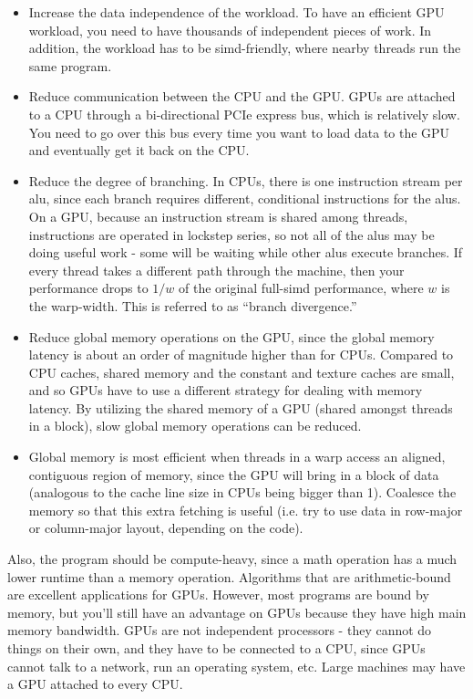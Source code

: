 \documentclass[10pt]{article}
\begin{document}
\begin{flushleft}
\begin{itemize}
\item Increase the data independence of the workload. To have an efficient GPU workload, you need to have thousands of independent pieces of work. In addition, the workload has to be \gls{simd}-friendly, where nearby threads run the same program. 
\item Reduce communication between the CPU and the GPU. GPUs are attached to a CPU through a bi-directional PCIe express bus, which is relatively slow. You need to go over this bus every time you want to load data to the GPU and eventually get it back on the CPU.
\item Reduce the degree of branching. In CPUs, there is one instruction stream per \gls{alu}, since each branch requires different, conditional instructions for the \gls{alu}s. On a GPU, because an instruction stream is shared among threads, instructions are operated in lockstep series, so not all of the \gls{alu}s may be doing useful work - some will be waiting while other \gls{alu}s execute branches. If every thread takes a different path through the machine, then your performance drops to \(1/w\) of the original full-\gls{simd} performance, where \(w\) is the warp-width. This is referred to as ``branch divergence.''
\item Reduce global memory operations on the GPU, since the global memory latency is about an order of magnitude higher than for CPUs. Compared to CPU caches, shared memory and the constant and texture caches are small, and so GPUs have to use a different strategy for dealing with memory latency. By utilizing the shared memory of a GPU (shared amongst threads in a block), slow global memory operations can be reduced.
\item Global memory is most efficient when threads in a warp access an aligned, contiguous region of memory, since the GPU will bring in a block of data (analogous to the cache line size in CPUs being bigger than 1). Coalesce the memory so that this extra fetching is useful (i.e. try to use data in row-major or column-major layout, depending on the code). 
\end{itemize}

Also, the program should be compute-heavy, since a math operation has a much lower runtime than a memory operation. Algorithms that are arithmetic-bound are excellent applications for GPUs. However, most programs are bound by memory, but you'll still have an advantage on GPUs because they have high main memory bandwidth. GPUs are not independent processors - they cannot do things on their own, and they have to be connected to a CPU, since GPUs cannot talk to a network, run an operating system, etc. Large machines may have a GPU attached to every CPU. 







\end{flushleft}
\end{document}
